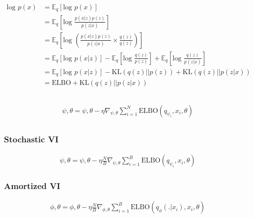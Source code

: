 \documentclass{article}
\newcommand*{\ex}[1]{
    \mathbb{E}_{#1}
}
\begin{document}
\begin{align*}
    \text{log } p(x) 
    &= \ex{q}[\text{log } p(x)] \\
    &= \ex{q}\left[\text{log } \frac{p(x|z)p(z)}{p(z|x)}\right] \\
    &= \ex{q}\left[\text{log } \left(\frac{p(x|z)p(z)}{p(z|x)} \times \frac{q(z)}{q(z)}\right) \right] \\
    &= \ex{q}[\text{log } p(x|z)] - \ex{q}\left[ \text{log } \frac{q(z)}{p(z)}\right] + \ex{q}\left[ \text{log } \frac{q(z)}{p(z|x)}\right] \\
    &= \ex{q}[\text{log } p(x|z)] - \text{KL} (q(z)||p(z)) +  \text{KL}(q(z)||p(z|x)) \\
    &= \text{ELBO} +  \text{KL}(q(z)||p(z|x))
\end{align*}


\subsection{}
\begin{align*}
    \psi, \theta = \psi, \theta -  \eta \nabla_{\psi, \theta} \sum_{i=1}^{N}\text{ELBO}(q_{\psi_i}, x_i, \theta)
\end{align*}



\subsection{}

\subsubsection*{Stochastic VI}
\begin{align*}
    \psi, \theta = \psi, \theta -  \eta \frac{N}{B} \nabla_{\psi, \theta} \sum_{i=1}^{B}\text{ELBO}(q_{\psi_i}, x_i, \theta)
\end{align*}

\subsubsection*{Amortized VI}
\begin{align*}
    \phi, \theta = \phi, \theta -  \eta \frac{N}{B} \nabla_{\phi, \theta} \sum_{i=1}^{B}\text{ELBO}(q_{\phi}(.|x_i), x_i, \theta)
\end{align*}
\end{document}
